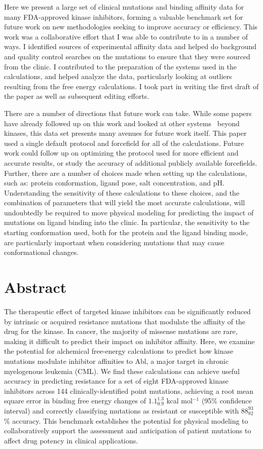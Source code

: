 \documentclass[phd,tocprelim]{cornell}
\begin{document}
Here we present a large set of clinical mutations and binding affinity data for many FDA-approved kinase inhibitors, forming a valuable benchmark set for future work on new methodologies seeking to improve accuracy or efficiency. This work was a collaborative effort that I was able to contribute to in a number of ways. I identified sources of experimental affinity data and helped do background and quality control searches on the mutations to ensure that they were sourced from the clinic. I contributed to the preparation of the systems used in the calculations, and helped analyze the data, particularly looking at outliers resulting from the free energy calculations. I took part in writing the first draft of the paper as well as subsequent editing efforts. 

There are a number of directions that future work can take. While some papers have already followed up on this work and looked at other systems~\citep{Aldeghi:2018ej} beyond kinases, this data set presents many avenues for future work itself. This paper used a single default protocol and forcefield for all of the calculations. Future work could follow up on optimizing the protocol used for more efficient and accurate results, or study the accuracy of additional publicly available forcefields. Further, there are a number of choices made when setting up the calculations, such as: protein conformation, ligand pose, salt concentration, and pH. Understanding the sensitivity of these calculations to these choices, and the combination of parameters that will yield the most accurate calculations, will undoubtedly be required to move physical modeling for predicting the impact of mutations on ligand binding into the clinic. In particular, the sensitivity to the starting conformation used, both for the protein and the ligand binding mode, are particularly important when considering mutations that may cause conformational changes. 


\section{Abstract}
	The therapeutic effect of targeted kinase inhibitors can be significantly reduced by intrinsic or acquired resistance mutations that modulate the affinity of the drug for the kinase.
	In cancer, the majority of missense mutations are rare, making it difficult to predict their impact on inhibitor affinity. 
	Here, we examine the potential for alchemical free-energy calculations to predict how kinase mutations modulate inhibitor affinities to Abl, a major target in chronic myelogenous leukemia (CML).
	We find these calculations can achieve useful accuracy in predicting resistance for a set of eight FDA-approved kinase inhibitors across 144 clinically-identified point mutations, achieving a root mean square error in binding free energy changes of $1.1_{0.9}^{1.3}$ kcal mol$^{-1}$ (95\% confidence interval) and correctly classifying mutations as resistant or susceptible with $88_{82}^{93}$\% accuracy.
	This benchmark establishes the potential for physical modeling to collaboratively support the assessment and anticipation of patient mutations to affect drug potency in clinical applications.
	
\end{document}
